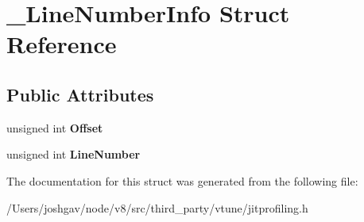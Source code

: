 \hypertarget{struct___line_number_info}{}\section{\+\_\+\+Line\+Number\+Info Struct Reference}
\label{struct___line_number_info}
\subsection*{Public Attributes}
\begin{DoxyCompactItemize}
\item 
unsigned int {\bfseries Offset}\hypertarget{struct___line_number_info_a05e4308f18790d0556bc28f3f916335e}{}\label{struct___line_number_info_a05e4308f18790d0556bc28f3f916335e}

\item 
unsigned int {\bfseries Line\+Number}\hypertarget{struct___line_number_info_a7bc3b6e7a1f4b21576a71525ab9f4d86}{}\label{struct___line_number_info_a7bc3b6e7a1f4b21576a71525ab9f4d86}

\end{DoxyCompactItemize}


The documentation for this struct was generated from the following file\+:\begin{DoxyCompactItemize}
\item 
/\+Users/joshgav/node/v8/src/third\+\_\+party/vtune/jitprofiling.\+h\end{DoxyCompactItemize}
